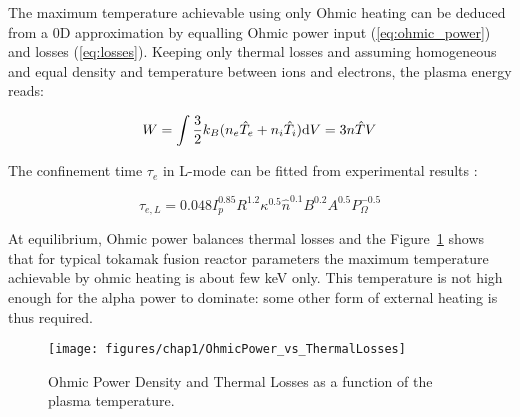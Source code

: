 The maximum temperature achievable using only Ohmic heating can be deduced from a 0D approximation by equalling Ohmic power input (\ref{eq:ohmic_power}) and losses (\ref{eq:losses}). Keeping only thermal losses and assuming homogeneous and equal density and temperature between ions and electrons, the plasma energy reads: 

\begin{equation}\label{eq:plasma_energy}
W 
= \int \frac{3}{2} k_B (n_e \hat T_e + n_i \hat T_i) {\mathrm{d}} V 
=
 3 n \hat{T} V
\end{equation}

The confinement time $\tau_e$ in L-mode can be fitted from experimental results \cite[Eq.(14.155)]{Freidberg2007}:

\begin{equation}\label{eq:tau_e_modeL}
\tau_{e,L}
=
0.048  I_p^{0.85} R^{1.2} \kappa^{0.5} \hat n^{0.1} B^{0.2} A^{0.5} P_\Omega^{-0.5}
\end{equation}  

At equilibrium, Ohmic power balances thermal losses and the Figure~\ref{fig:ohmicpowervsthermallosses} shows that for typical tokamak fusion reactor parameters
the maximum temperature achievable by ohmic heating is about few keV only. This temperature is not high enough for the alpha power to dominate: some other form of external heating is thus required. 

\begin{figure}[h]
	\centering
	\texttt{[image: figures/chap1/OhmicPower\_vs\_ThermalLosses]}
	\caption{Ohmic Power Density and Thermal Losses as a function of the plasma temperature.}
	\label{fig:ohmicpowervsthermallosses}
\end{figure}


